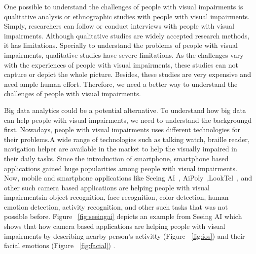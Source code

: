 \documentclass[sigconf]{acmart}
\begin{document}
One possible to understand the challenges of people with visual impairments is qualitative analysis or ethnographic studies with people with visual impairments. Simply, researchers can follow or conduct interviews with people with visual impairments. Although qualitative studies are widely accepted research methods, it has limitations. Specially to understand the problems of people with visual impairments, qualitative studies have severe limitations. As the challenges vary with the experiences of people with visual impairments, these studies can not capture or depict the whole picture. Besides, these studies are very expensive and need ample human effort. Therefore, we need a better way to understand the challenges of people with visual impairments.

Big data analytics could be a potential alternative. To understand how big data can help people with visual impairments, we need to understand the backgroungd first. Nowadays, people with visual impairments uses different technologies for their problems.A wide range of technologies such as talking watch, braille reader, navigation helper are available in the market to help the visually impaired in their daily tasks. Since the introduction of smartphone, smartphone based applications gained huge popularities among people with visual impairments. Now, mobile and smartphone applications like Seeing AI~\cite{seeingai}, AiPoly~\cite{aipoly},LookTel~\cite{looktel}, and other such camera based applications are helping people with visual impairmentsin object recognition, face recognition, color detection, human emotion detection, activity recognition, and other such tasks that was not possible before. Figure ~\ref{fig:seeingai} depicts an example from Seeing AI which shows that how camera based applications are helping people with visual impairments by describing nearby person's activitty (Figure ~\ref{fig:ios}) and their facial emotions (Figure ~\ref{fig:facial}) .
\end{document}
